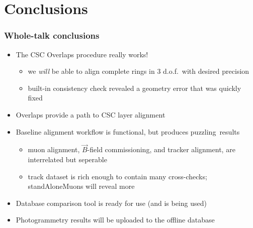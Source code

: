 \documentclass[compress]{beamer}
\begin{document}
\section*{Conclusions}

\begin{frame}
\frametitle{Whole-talk conclusions}

\begin{itemize}\setlength{\itemsep}{0.2 cm}
\item The CSC Overlaps procedure really works!
\begin{itemize}
\item we {\it will} be able to align complete rings in 3 d.o.f.\ with desired precision
\item built-in consistency check revealed a geometry error that was quickly fixed
\end{itemize}

\item Overlaps provide a path to CSC layer alignment

\item Baseline alignment workflow is functional, but produces \mbox{puzzling results\hspace{-1 cm}}
\begin{itemize}
\item muon alignment, $\vec{B}$-field commissioning, and tracker alignment, are interrelated but seperable

\item track dataset is rich enough to contain many cross-checks; standAloneMuons will reveal more
\end{itemize}

\item Database comparison tool is ready for use (and is being used)

\item Photogrammetry results will be uploaded to the offline database
\end{itemize}

\label{numpages}
\end{frame}
\end{document}
